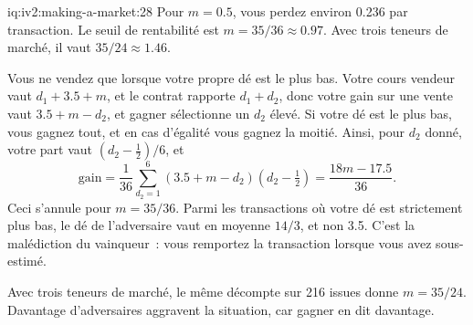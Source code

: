 \begin{solution}{iq:iv2:making-a-market:28}
Pour $m = 0.5$, vous perdez environ 0.236 par transaction. Le seuil de rentabilité est $m = 35/36 \approx 0.97$. Avec trois teneurs de marché, il vaut $35/24 \approx 1.46$.

Vous ne vendez que lorsque votre propre dé est le plus bas. Votre cours vendeur vaut $d_1 + 3.5 + m$, et le contrat rapporte $d_1 + d_2$, donc votre gain sur une vente vaut $3.5 + m - d_2$, et gagner sélectionne un $d_2$ élevé. Si votre dé est le plus bas, vous gagnez tout, et en cas d'égalité vous gagnez la moitié. Ainsi, pour $d_2$ donné, votre part vaut $(d_2 - \tfrac12)/6$, et
\[
\text{gain} = \frac{1}{36} \sum_{d_2 = 1}^6 \left(3.5 + m - d_2\right) \left(d_2 - \tfrac12\right) = \frac{18m - 17.5}{36}.
\]
Ceci s'annule pour $m = 35/36$. Parmi les transactions où votre dé est strictement plus bas, le dé de l'adversaire vaut en moyenne $14/3$, et non 3.5. C'est la malédiction du vainqueur~: vous remportez la transaction lorsque vous avez sous-estimé.

Avec trois teneurs de marché, le même décompte sur 216 issues donne $m = 35/24$. Davantage d'adversaires aggravent la situation, car gagner en dit davantage.

\end{solution}

